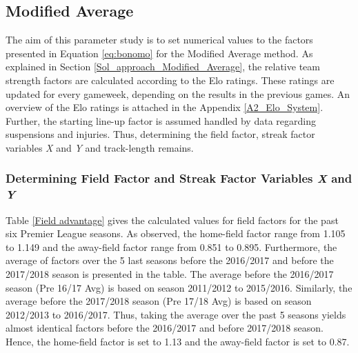 \subsection{Modified Average}\label{sec:comp_s_MA}

The aim of this parameter study is to set numerical values to the factors presented in Equation \ref{eq:bonomo} for the Modified Average method. As explained in Section \ref{Sol_approach_Modified_Average}, the relative team strength factors are calculated according to the Elo ratings. These ratings are updated for every gameweek, depending on the results in the previous games. An overview of the Elo ratings is attached in the Appendix \ref{A2_Elo_System}. Further, the starting line-up factor is assumed handled by data regarding suspensions and injuries. Thus, determining the field factor, streak factor variables \textit{X} and \textit{Y} and track-length remains.


\subsubsection{Determining Field Factor and Streak Factor Variables \textit{X} and \textit{Y}}

Table \ref{Field advantage} gives the calculated values for field factors for the past six Premier League seasons. As observed, the home-field factor range from 1.105 to 1.149 and the away-field factor range from 0.851 to 0.895. Furthermore, the average of factors over the 5 last seasons before the 2016/2017 and before the 2017/2018 season is presented in the table. The average before the 2016/2017 season (Pre 16/17 Avg) is based on season 2011/2012 to 2015/2016. Similarly, the average before the 2017/2018 season (Pre 17/18 Avg) is based on season 2012/2013 to 2016/2017. Thus, taking the average over the past 5 seasons yields almost identical factors before the 2016/2017 and before 2017/2018 season. Hence, the home-field factor is set to 1.13 and the away-field factor is set to 0.87. 


\begin{table}[!htb]
\centering
\smaller
{}
\caption{Field factors for previous 6 seasons.}
\label{Field advantage}
\end{table}

